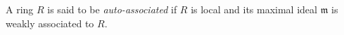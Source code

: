 \begin{definition}
\label{definition-auto-ass}
A ring $R$ is said to be {\it auto-associated} if $R$ is local and its
maximal ideal $\mathfrak m$ is weakly associated to $R$.
\end{definition}